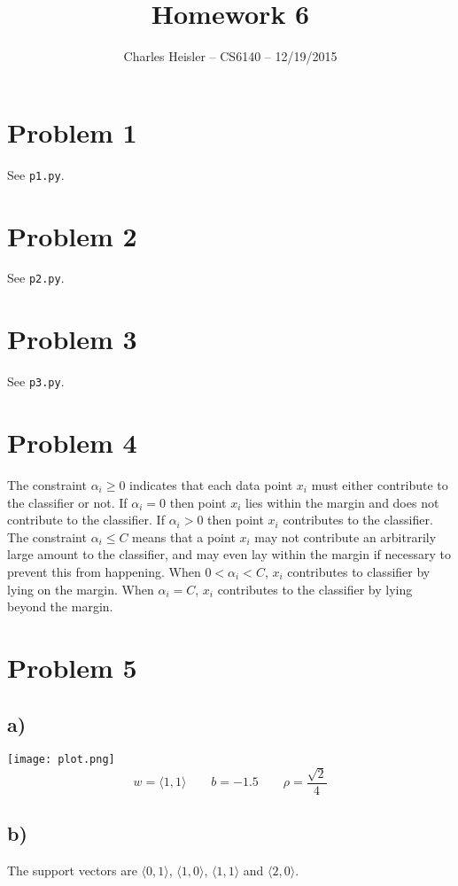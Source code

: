 \documentclass[12pt]{article}
\title{Homework 6}
\author{Charles Heisler -- CS6140 -- 12/19/2015}
\date{}
\begin{document}
\maketitle

\section*{Problem 1}
See \texttt{p1.py}.

\section*{Problem 2}
See \texttt{p2.py}.

\section*{Problem 3}
See \texttt{p3.py}.

\section*{Problem 4}
The constraint $\alpha_i \geq 0$ indicates that each data point $x_i$ must either contribute to the classifier or not. If $\alpha_i = 0$ then point $x_i$ lies within the margin and does not contribute to the classifier. If $\alpha_i > 0$ then point $x_i$ contributes to the classifier. The constraint $\alpha_i \leq C$ means that a point $x_i$ may not contribute an arbitrarily large amount to the classifier, and may even lay within the margin if necessary to prevent this from happening. When $0 < \alpha_i < C$, $x_i$ contributes to classifier by lying on the margin. When $\alpha_i = C$, $x_i$ contributes to the classifier by lying beyond the margin.

\section*{Problem 5}

\subsection*{a)}
\texttt{[image: plot.png]} \\
\[w = \langle 1,1 \rangle \qquad b = -1.5 \qquad \rho = \frac{\sqrt{2}}{4} \]

\subsection*{b)}
The support vectors are $\langle 0,1 \rangle$, $\langle 1,0 \rangle$, $\langle 1,1 \rangle$ and $\langle 2,0 \rangle$.
\end{document}
